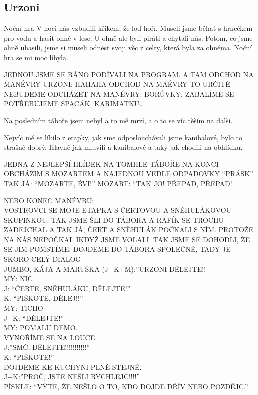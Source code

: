 \subsection*{Urzoni} %
\label{sub:urzoni}

\begin{multicols}{2}
	
Noční hra
V noci nás vzbudili křikem, že loď hoří. Museli jsme běhat s hrnečkem pro vodu a hasit ohně v lese. U ohně ale byli piráti a chytali nás. Potom, co jsme ohně uhasili, jsme si museli odnést svoji věc z celty, která byla za ohněma. Noční hra se mi moc líbyla.


JEDNOU JSME SE RÁNO PODÍVALI NA PROGRAM. A TAM ODCHOD NA MANÉVRY URZONI: HAHAHA ODCHOD NA MAÉVRY TO URČITĚ NEBUDEME ODCHÁZET NA MANÉVRY. BORŮVKY: ZABALÍME SE POTŘEBUJEME SPACÁK, KARIMATKU…


Na posledním táboře jsem nebyl a to mě mrzí, a o to se víc těším na další.


Nejvíc mě se líbilo z etapky, jak sme odposlouchávali jsme kanibalové, bylo to strašně dobrý. Hlavně jak mluvili a kanibalové a taky jak chodili na obhlídku.



JEDNA Z NEJLEPŠÍ HLÍDEK  NA TOMHLE TÁBOŘE
NA KONCI OBCHÁZIM S MOZARTEM A NAJEDNOU VEDLE ODPADOVKY “PRÁSK”. TAK JÁ: “MOZARTE, ŘVI!” MOZART: “TAK JO! PŘEPAD, PŘEPAD!

NEBO KONEC MANÉVRŮ:\\
VOSTROVCI SE MOJE ETAPKA S ČERTOVOU A SNĚHULÁKOVOU SKUPINKOU. TAK JSME ŠLI DO TÁBORA A RAFÍK SE TROCHU ZADEJCHAL A TAK JÁ, ČERT A SNĚHULÁK POČKALI S NÍM. PROTOŽE NA NÁS NEPOČKAL IKDYŽ JSME VOLALI. TAK JSME SE DOHODLI, ŽE SE JIM POMSTÍME. DOJDEME DO TÁBORA SPOLEČNĚ, TADY JE SKORO CELÝ DIALOG\\
JUMBO, KÁJA A MARUŠKA (J+K+M):”URZONI DĚLEJTE!!\\
MY: NIC\\
J: “ČERTE, SNĚHULÁKU, DĚLEJTE!”\\
K: “PIŠKOTE, DĚLEJ!!”\\
MY: TICHO\\
J+K: “DĚLEJTE!”\\
MY: POMALU DEMO.\\
VYNOŘÍME SE NA LOUCE.\\
J:”SMČ, DĚLEJTE!!!!!!!!!!!”\\
K: “PIŠKOTE!”\\
DOJDEME KE KUCHYNI PLNĚ STEJNĚ.\\
J+K:”PROČ, JSTE NEŠLI RYCHLEJC!!!!”\\
PÍSKLE: “VÝTE, ŽE NEŠLO O TO, KDO DOJDE DŘÍV NEBO POZDĚJC.”


\end{multicols}
